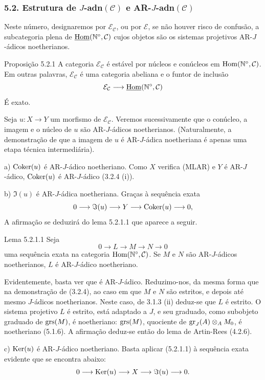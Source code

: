 \subsubsection*{5.2. Estrutura de \(J\)-adn\((\mathcal C)\) e AR-\(J\)-adn\((\mathcal C)\)}

Neste número, designaremos por \(\mathcal E_{\mathcal C}\), ou por \(\mathcal E\), se não houver risco de confusão, a subcategoria plena de \(\underline{\operatorname{Hom}}(\mathbb N^\circ,\mathcal C)\) cujos objetos são os sistemas projetivos AR-\(J\)-ádicos noetherianos.

\begin{statement}{Proposição 5.2.1}
A categoria \(\mathcal E_{\mathcal C}\) é estável por núcleos e conúcleos em \(\operatorname{Hom}(\mathbb N^\circ,\mathcal C)\). Em outras palavras, \(\mathcal E_{\mathcal C}\) é uma categoria abeliana e o funtor de inclusão
\[
\mathcal E_{\mathcal C}\longrightarrow \underline{\operatorname{Hom}}(\mathbb N^\circ,\mathcal C)
\]
É exato.
\end{statement}

\begin{prooftext}
Seja \(u:X\to Y\) um morfismo de \(\mathcal E_{\mathcal C}\). Veremos sucessivamente que o conúcleo, a imagem e o núcleo de \(u\) são AR-\(J\)-ádicos noetherianos. (Naturalmente, a demonstração de que a imagem de \(u\) é AR-\(J\)-ádica noetheriana é apenas uma etapa técnica intermediária).

a) \(\operatorname{Coker}(u)\) é AR-\(J\)-ádico noetheriano. Como \(X\) verifica (MLAR) e \(Y\) é AR-\(J\)-ádico, \(\operatorname{Coker}(u)\) é AR-\(J\)-ádico (3.2.4 (i)).

b) \(\Im(u)\) é AR-\(J\)-ádica noetheriana. Graças à sequência exata
\[
0\longrightarrow \Im(u)\longrightarrow Y\longrightarrow \operatorname{Coker}(u)\longrightarrow 0,
\]
A afirmação se deduzirá do lema 5.2.1.1 que aparece a seguir.
\end{prooftext}

\begin{statement}{Lema 5.2.1.1}
Seja
\[
0\longrightarrow L\longrightarrow M\longrightarrow N\longrightarrow0
\]
uma sequência exata na categoria \(\operatorname{Hom}(\mathbb N^\circ,\mathcal C)\). Se \(M\) e \(N\) são AR-\(J\)-ádicos noetherianos, \(L\) é AR-\(J\)-ádico noetheriano.
\end{statement}

\begin{prooftext}
Evidentemente, basta ver que é AR-\(J\)-ádico. Reduzimo-nos, da mesma forma que na demonstração de (3.2.4), ao caso em que \(M\) e \(N\) são estritos, e depois até mesmo \(J\)-ádicos noetherianos. Neste caso, de 3.1.3 (ii) deduz-se que \(L\) é estrito. O sistema projetivo \(L\) é estrito, está adaptado a \(J\), e seu graduado, como subobjeto graduado de \(\operatorname{grs}(M)\), é noetheriano: \(\operatorname{grs}(M)\), quociente de \(\operatorname{gr}_J(A)\otimes_A M_0\), é noetheriano (5.1.6). A afirmação deduz-se então do lema de Artin-Rees (4.2.6).
\end{prooftext}

c) \(\operatorname{Ker}(u)\) é AR-\(J\)-ádico noetheriano. Basta aplicar (5.2.1.1) à sequência exata evidente que se encontra abaixo:
\[
0\longrightarrow \operatorname{Ker}(u)\longrightarrow X\longrightarrow \Im(u)\longrightarrow0.
\]
